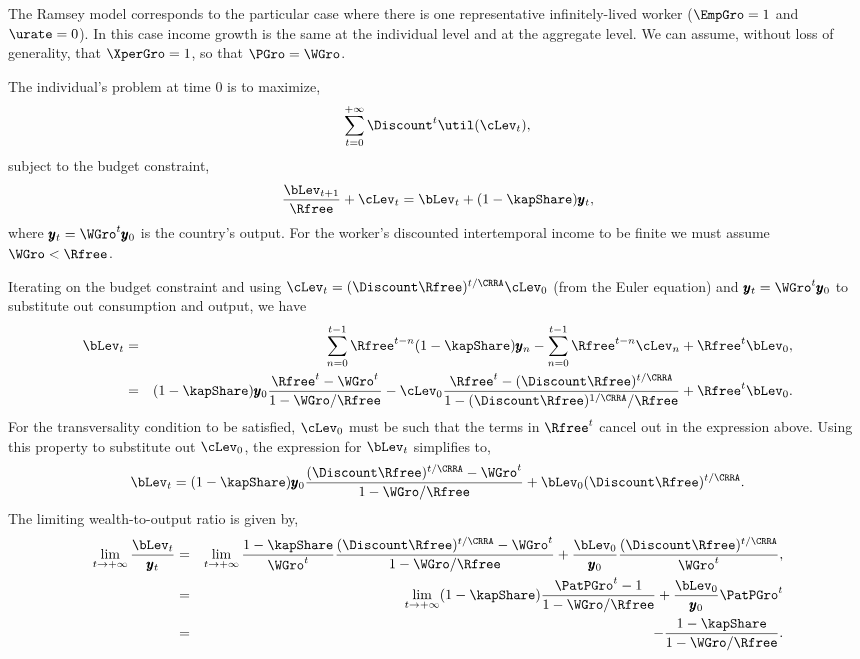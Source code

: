 \documentclass[titlepage]{\econtex}\newcommand{\texname}{cjSOE}
\renewcommand{\gdpLev}{\ensuremath{\pmb{y}}}
\begin{document}
The Ramsey model corresponds to the particular case where there is one representative infinitely-lived worker ($\EmpGro=1$ and $\urate=0$). In this case income growth is the same at the individual level and at the aggregate level. We can assume, without loss of generality, that $\XperGro=1$, so that $\PGro=\WGro$.

The individual's problem at time $0$ is to maximize,
\begin{equation*}
\sum_{t=0}^{+\infty} \Discount^t \util(\cLev_t),
\end{equation*}
subject to the budget constraint,
\begin{equation*}
\frac{\bLev_{t+1}}{\Rfree}+\cLev_t=\bLev_t+ (1-\kapShare) \gdpLev_t,
\end{equation*}
where $\gdpLev_t=\WGro^t \gdpLev_0$ is the country's output. For the worker's discounted intertemporal income to be finite we must assume $\WGro <\Rfree$.

Iterating on the budget constraint and using $\cLev_t=(\Discount \Rfree )^{t/\CRRA} \cLev_0$ (from the Euler equation) and $\gdpLev_t=\WGro^t \gdpLev_0$ to substitute out consumption and output, we have
\begin{eqnarray*}
\bLev_t&=&\sum_{n=0}^{t-1}\Rfree^{t-n} (1-\kapShare) \gdpLev_n - \sum_{n=0}^{t-1}\Rfree^{t-n} \cLev_n+\Rfree^t \bLev_0,
\\ &=& (1-\kapShare) \gdpLev_0 \frac{\Rfree^t -\WGro^t}{1-\WGro/\Rfree}-\cLev_0 \frac{\Rfree^t -(\Discount \Rfree )^{t/\CRRA}}{1-(\Discount \Rfree )^{1/\CRRA}/\Rfree}+\Rfree^t \bLev_0.
\end{eqnarray*}
For the transversality condition to be satisfied, $\cLev_0$ must be such that the terms in $\Rfree^t$ cancel out in the expression above. Using this property to substitute out $\cLev_0$, the expression for $\bLev_t$ simplifies to,
\begin{equation*}
\bLev_t = (1-\kapShare) \gdpLev_0 \frac{(\Discount \Rfree )^{t/\CRRA}-\WGro^t}{1-\WGro/\Rfree} +\bLev_0 (\Discount \Rfree )^{t/\CRRA}.
\end{equation*}
The limiting wealth-to-output ratio is given by,
\begin{eqnarray*}
\lim_{t \rightarrow +\infty} \frac{\bLev_t}{\gdpLev_t}&=& \lim_{t \rightarrow +\infty}
\frac{1-\kapShare}{\WGro^{t}} \frac{(\Discount \Rfree )^{t/\CRRA}-\WGro^t}{1-\WGro/\Rfree}
+\frac{\bLev_0}{\gdpLev_0}\frac{(\Discount \Rfree )^{t/\CRRA}}{\WGro^t},  \\
 &=& \lim_{t \rightarrow +\infty}(1-\kapShare) \frac{\PatPGro^t-1}{1-\WGro/\Rfree}+\frac{\bLev_0}{\gdpLev_0}\PatPGro^t  \\
 &=& -\frac{1-\kapShare}{1-\WGro/\Rfree}.
 \end{eqnarray*}
\end{document}

